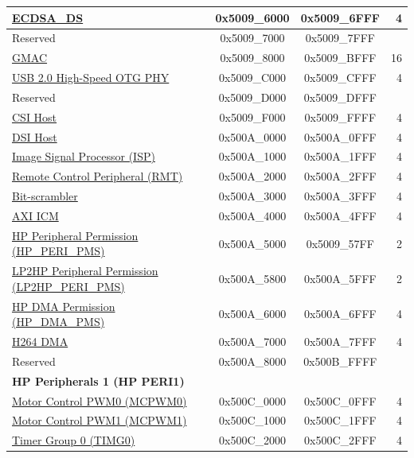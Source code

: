 \begin{ThreePartTable}
\begin{longtable}[c]{ |p{7cm}|c|c|r| }
\hyperref[mod:ecdsa]{ECDSA\_DS}                    & 0x5009\_6000 & 0x5009\_6FFF &   4\\\hline
\rowcolor{gray!25}  Reserved                   & 0x5009\_7000 & 0x5009\_7FFF &   \\\hline
\hyperref[mod:ethernetmac]{GMAC}               & 0x5009\_8000 & 0x5009\_BFFF &   16\\\hline
\hyperref[mod:usbotghs]{USB 2.0 High-Speed OTG PHY}               & 0x5009\_C000 & 0x5009\_CFFF &   4\\\hline
\rowcolor{gray!25}  Reserved                   & 0x5009\_D000 & 0x5009\_DFFF &   \\\hline
\hyperref[mod:mipicsi]{CSI Host}              & 0x5009\_F000 & 0x5009\_FFFF &   4\\\hline
\hyperref[mod:mipidsi]{DSI Host}              & 0x500A\_0000 & 0x500A\_0FFF &   4\\\hline
\hyperref[mod:isp]{Image Signal Processor (ISP)}                   & 0x500A\_1000 & 0x500A\_1FFF &   4\\\hline
\hyperref[mod:rmt]{Remote Control Peripheral (RMT)}                   & 0x500A\_2000 & 0x500A\_2FFF &   4\\\hline
\hyperref[mod:bitscrm]{Bit-scrambler}         & 0x500A\_3000 & 0x500A\_3FFF &   4\\\hline
\hyperref[mod:sysreg]{AXI ICM}               & 0x500A\_4000 & 0x500A\_4FFF &   4\\\hline
\hyperref[mod:permctrl]{HP Peripheral Permission (HP\_PERI\_PMS)}     & 0x500A\_5000 & 0x5009\_57FF &   2\\\hline
\hyperref[mod:permctrl]{LP2HP Peripheral Permission (LP2HP\_PERI\_PMS)} & 0x500A\_5800 & 0x500A\_5FFF &   2\\\hline
\hyperref[mod:permctrl]{HP DMA Permission (HP\_DMA\_PMS)}        & 0x500A\_6000 & 0x500A\_6FFF &   4\\\hline
\hyperref[mod:h264enc]{H264 DMA}            & 0x500A\_7000 & 0x500A\_7FFF &   4\\\hline
\rowcolor{gray!25}  Reserved                   & 0x500A\_8000 & 0x500B\_FFFF &   \\\hline
\multicolumn{4}{|l|}{\textbf{HP Peripherals 1 (HP PERI1)}} \\ \hline
\hyperref[mod:mcpwm]{Motor Control PWM0 (MCPWM0)} & 0x500C\_0000 & 0x500C\_0FFF &   4 \\\hline
\hyperref[mod:mcpwm]{Motor Control PWM1 (MCPWM1)} & 0x500C\_1000 & 0x500C\_1FFF &   4 \\\hline
\hyperref[mod:timg]{Timer Group 0 (TIMG0)}        & 0x500C\_2000 & 0x500C\_2FFF &   4 \\\hline

\end{longtable}
\end{ThreePartTable}
